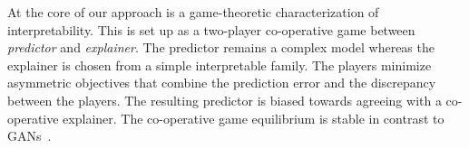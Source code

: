 \iffalse
 new notion of \emph{semi-intrinsic interpretability} that explanations are intrinsic to model training but extrinsic to model itself.
By such nature, the derived approach can operate on an unconstrained set of predictive/interpretable models, \ie, it does not restrict their architectures. 
Meanwhile, the explanations are \textit{intrinsic} in the objective and trained \textit{in coordination} with the predictive model to be explained. 
\fi

At the core of our approach is a game-theoretic characterization of interpretability. This is set up as a two-player co-operative game between \emph{predictor} and \emph{explainer}. The predictor remains a complex model whereas the explainer is chosen from a simple interpretable family. The players minimize asymmetric objectives that combine the prediction error and the discrepancy between the players. The resulting predictor is biased towards agreeing with a co-operative explainer. The co-operative game equilibrium is stable in contrast to  GANs~\cite{goodfellow2014generative}.


